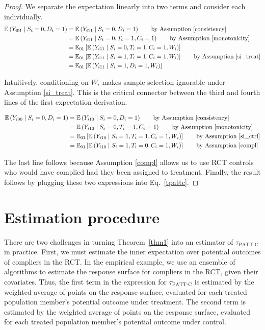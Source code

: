\documentclass[hidelinks,12pt]{article}
\newcommand{\ex}{\mathbb{E}} %
\begin{document}
\begin{proof}
We separate the expectation linearly into two terms and consider each individually.
\begin{align*}
\ex\left(Y_{i01} \mid S_i=0,D_i=1\right) &= \ex\left(Y_{i11} \mid S_i=0, D_i=1\right) \tag*{by Assumption \eqref{consistency}} \\
&= \ex\left(Y_{i11} \mid S_i=0, T_i=1, C_i=1\right) \tag*{by Assumption \eqref{monotonicity}} \\
&= \ex_{01}\left[  \ex\left(Y_{i11} \mid S_i=0, T_i=1, C_i=1, W_i\right) \right] \\
&= \ex_{01}\left[  \ex\left(Y_{i11} \mid S_i=1, T_i=1, C_i=1, W_i\right) \right] \tag*{by Assumption \eqref{si_treat}} \\
&= \ex_{01}\left[  \ex\left(Y_{i11} \mid S_i=1, D_i=1, W_i\right)\right] 
\end{align*}

Intuitively, conditioning on $W_i$ makes sample selection ignorable under Assumption \eqref{si_treat}. This is the critical connector between the third and fourth lines of the first expectation derivation.
	
\begin{align*}
\ex\left(Y_{i00} \mid S_i=0, D_i=1\right) &= \ex\left(Y_{i10} \mid S_i=0, D_i=1\right) \tag*{by Assumption \eqref{consistency}} \\
&= \ex\left(Y_{i10} \mid S_i=0, T_i=1, C_i=1\right) \tag*{by Assumption \eqref{monotonicity}} \\
&= \ex_{01}\left[  \ex\left(Y_{i10} \mid S_i=1, T_i=1, C_i=1, W_i\right) \right] \tag*{by Assumption \eqref{si_ctrl}} \\
&= \ex_{01}\left[  \ex\left(Y_{i10} \mid S_i=1, T_i=0, C_i=1, W_i\right) \right] \tag*{by Assumption \eqref{compl}}\\
\end{align*}

The last line follows because Assumption \eqref{compl} allows us to use RCT controls who would have complied had they been assigned to treatment. Finally, the result follows by plugging these two expressions into Eq.~\eqref{tpattc}.
\end{proof}

\section{Estimation procedure}\label{estimation}

There are two challenges in turning Theorem~\eqref{thm1} into an estimator of $\tau_{\text{PATT-C}}$ in practice. First, we must estimate the inner expectation over potential outcomes of compliers in the RCT. In the empirical example, we use an ensemble of algorithms \citep{van2007} to estimate the response surface for compliers in the RCT, given their covariates. Thus, the first term in the expression for $\tau_{\text{PATT-C}}$ is estimated by the weighted average of points on the response surface, evaluated for each treated population member's potential outcome under treatment. The second term is estimated by the weighted average of points on the response surface, evaluated for each treated population member's potential outcome under control.
\end{document}
